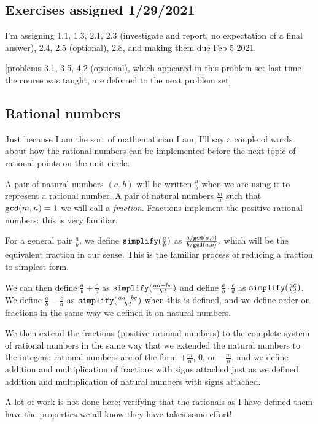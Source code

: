 \documentclass[12pt]{article}
\begin{document}
\subsection{Exercises  assigned 1/29/2021}

I'm assigning 1.1, 1.3, 2.1, 2.3 (investigate and report, no expectation of a final answer), 2.4, 2.5 (optional), 2.8,  and making them due Feb 5 2021.

[problems 3.1, 3.5, 4.2 (optional), which appeared in this problem set last time the course was taught, are deferred to the next problem set]


\subsection{Rational numbers}

Just because I am the sort of mathematician I am, I'll say a couple of words about how the rational numbers can be implemented before the next topic of rational points on the unit circle.

A pair of natural numbers $(a,b)$ will be written $\frac ab$ when we are using it to represent a rational number.
A pair of natural numbers $\frac mn$ such that ${\tt gcd}(m,n)=1$ we will call a {\em fraction}.  Fractions implement the positive rational numbers:  this is very familiar.

For a general pair $\frac ab$, we define ${\tt simplify}(\frac ab)$ as $\frac{a/{\tt gcd}(a,b)}{b/{\tt gcd}(a,b)}$, which will be the equivalent fraction in our sense.   This is the familiar process of reducing a fraction to simplest form.

We can then define $\frac ab + \frac cd$ as ${\tt simplify}(\frac{ad+bc}{bd})$ and define $\frac ab \cdot \frac cd$ as
${\tt simplify}(\frac{ac}{bd})$.  We define $\frac ab - \frac cd$ as ${\tt simplify}(\frac{ad-bc}{bd})$ when this is defined, and we define order on fractions in the same way we defined it on natural numbers.

We then extend the fractions (positive rational numbers) to the complete system of rational numbers in the same way
that we extended the natural numbers to the integers:  rational numbers are of the form $+\frac mn$, 0, or $-\frac mn$, and we define addition and multiplication of fractions with signs attached just as we defined addition and multiplication of natural numbers with signs attached.

A lot of work is not done here:  verifying that the rationals as I have defined them have the properties we all know they have takes some effort!
\end{document}
